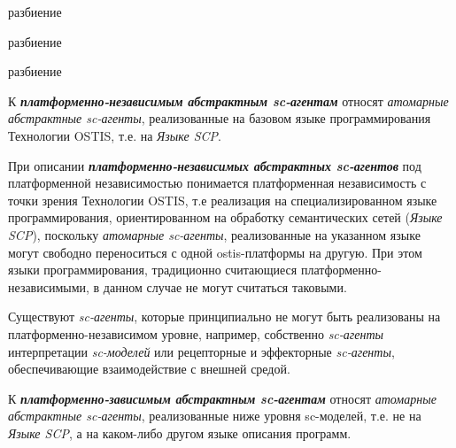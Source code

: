 \begin{SCn}
\begin{scnrelfromset}{разбиение}
\end{scnrelfromset}

\begin{scnrelfromset}{разбиение}
\end{scnrelfromset}	

\begin{scnrelfromset}{разбиение}
\end{scnrelfromset}	
\end{SCn}

К \textbf{\textit{платформенно-независимым абстрактным \mbox{sc-агентам}}} относят \textit{атомарные абстрактные sc-агенты}, реализованные на базовом языке программирования Технологии OSTIS, т.е. на \textit{Языке SCP}.

При описании \textbf{\textit{платформенно-независимых абстрактных sc-агентов}} под платформенной независимостью понимается платформенная независимость с точки зрения Технологии OSTIS, т.е реализация на специализированном языке программирования, ориентированном на обработку семантических сетей (\textit{Языке SCP}), поскольку \textit{атомарные sc-агенты}, реализованные на указанном языке могут свободно переноситься с одной ostis-платформы на другую. При этом языки программирования, традиционно считающиеся платформенно-независимыми, в данном случае не могут считаться таковыми.

Существуют \textit{sc-агенты}, которые принципиально не могут быть реализованы на платформенно-независимом уровне, например, собственно \textit{sc-агенты} интерпретации \textit{sc-моделей} или рецепторные и эффекторные \textit{sc-агенты}, обеспечивающие взаимодействие с внешней средой.

К \textbf{\textit{платформенно-зависимым абстрактным sc-агентам}} относят \textit{атомарные абстрактные sc-агенты}, реализованные ниже уровня sc-моделей, т.е. не на \textit{Языке SCP}, а на каком-либо другом языке описания программ.

